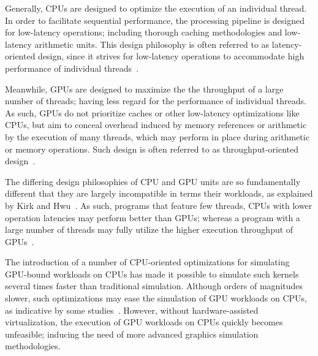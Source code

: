 Generally, CPUs are designed to optimize the execution of an individual thread.
In order to facilitate sequential performance, the processing pipeline is designed for low-latency operations; including thorough caching methodologies and low-latency arithmetic units.
This design philosophy is often referred to as latency-oriented design, since it strives for low-latency operations to accommodate high performance of individual threads~.

Meanwhile, GPUs are designed to maximize the the throughput of a large number of threads; having less regard for the performance of individual threads.
As such, GPUs do not prioritize caches or other low-latency optimizations like CPUs, but aim to conceal overhead induced by memory references or arithmetic by the execution of many threads, which may perform in place during arithmetic or memory operations.
Such design is often referred to as throughput-oriented design~.

The differing design philosophies of CPU and GPU units are so fundamentally different that they are largely incompatible in terms their workloads, as explained by Kirk and Hwu~.
As such, programs that feature few threads, CPUs with lower operation latencies may perform better than GPUs; whereas a program with a large number of threads may fully utilize the higher execution throughput of GPUs~.

The introduction of a number of CPU-oriented optimizations for simulating GPU-bound workloads on CPUs has made it possible to simulate such kernels several times faster than traditional simulation.
Although orders of magnitudes slower, such optimizations may ease the simulation of GPU workloads on CPUs, as indicative by some studies~.
However, without hardware-assisted virtualization, the execution of GPU workloads on CPUs quickly becomes unfeasible; inducing the need of more advanced graphics simulation methodologies.

